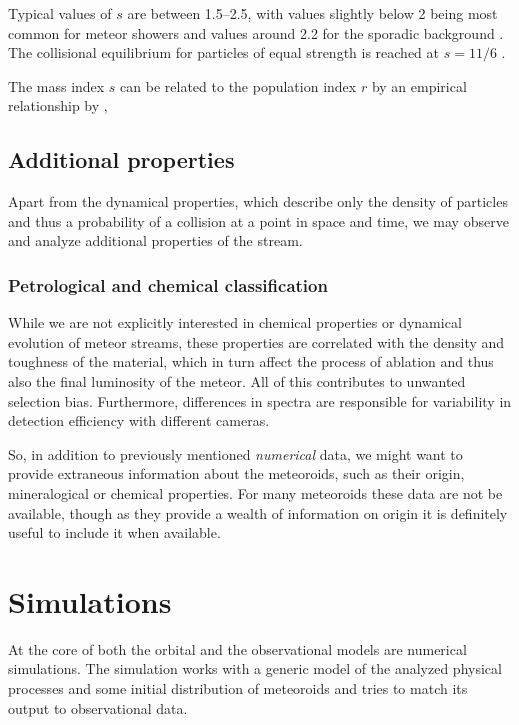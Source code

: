             Typical values of $s$ are between \numrange{1.5}{2.5}, with values slightly below 2 being most common
            for meteor showers and values around \num{2.2} for the sporadic background \citep{blaauw+2011}.
            The collisional equilibrium for particles of equal strength is reached at $s = 11/6$ \citep{dohnanyi1969}.

            The mass index $s$ can be related to the population index $r$ by an empirical relationship by \citet{koschack+1990},

    \subsection{Additional properties} \label{moa}
        Apart from the dynamical properties, which describe only the density of particles
        and thus a probability of a collision at a point in space and time,
        we may observe and analyze additional properties of the stream.

        \subsubsection{Petrological and chemical classification} \label{moac}
            While we are not explicitly interested in chemical properties
            or dynamical evolution of meteor streams, these properties
            are correlated with the density and toughness of the material,
            which in turn affect the process of ablation
            and thus also the final luminosity of the meteor.
            All of this contributes to unwanted selection bias.
            Furthermore, differences in spectra are responsible for
            variability in detection efficiency with different cameras.

            So, in addition to previously mentioned \textit{numerical} data, we might want to
            provide extraneous information about the meteoroids, such as their origin,
            mineralogical or chemical properties.
            For many meteoroids these data are not be available,
            though as they provide a wealth of information on origin
            it is definitely useful to include it when available.


\section{Simulations} \label{mi}
    At the core of both the orbital and the observational models are numerical simulations.
    The simulation works with a generic model of the analyzed physical processes and some initial
    distribution of meteoroids and tries to match its output to observational data.

